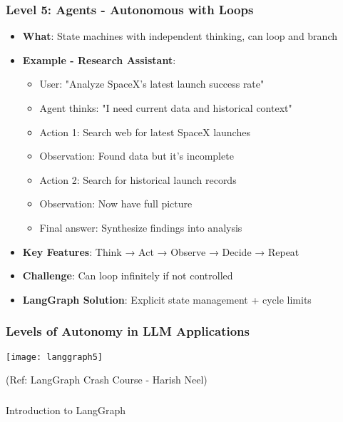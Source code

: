 \begin{frame}[fragile]\frametitle{Level 5: Agents - Autonomous with Loops}
      \begin{itemize}
        \item \textbf{What}: State machines with independent thinking, can loop and branch
        \item \textbf{Example - Research Assistant}:
        \begin{itemize}
            \item User: "Analyze SpaceX's latest launch success rate"
            \item Agent thinks: "I need current data and historical context"
            \item Action 1: Search web for latest SpaceX launches
            \item Observation: Found data but it's incomplete
            \item Action 2: Search for historical launch records
            \item Observation: Now have full picture
            \item Final answer: Synthesize findings into analysis
        \end{itemize}
        \item \textbf{Key Features}: Think → Act → Observe → Decide → Repeat
        \item \textbf{Challenge}: Can loop infinitely if not controlled
        \item \textbf{LangGraph Solution}: Explicit state management + cycle limits
      \end{itemize}
\end{frame}

\begin{frame}[fragile]\frametitle{Levels of Autonomy in LLM Applications}
\begin{center}
\texttt{[image: langgraph5]}

{\tiny (Ref: LangGraph Crash Course - Harish Neel)}
\end{center}	  
\end{frame}

\begin{frame}[fragile]\frametitle{}
\begin{center}
{\Large Introduction to LangGraph}
\end{center}
\end{frame}

